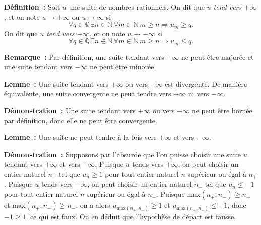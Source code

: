     \done

\medskip

\noindent\textbf{Définition :} Soit $u$ une suite de nombres rationnels. 
    On dit que \emph{$u$ tend vers $+\infty$}, et on note $u \rightarrow + \infty$ ou $u \rightarrow \infty$ si
    \begin{equation*}
        \forall q \in \mathbb{Q} \, 
        \exists n \in \mathbb{N} \, 
        \forall m \in \mathbb{N} \, 
        m \geq n \Rightarrow
            u_m \geq q.
    \end{equation*}
    On dit que \emph{$u$ tend vers $-\infty$}, et on note $u \rightarrow - \infty$ si
    \begin{equation*}
        \forall q \in \mathbb{Q} \, 
        \exists n \in \mathbb{N} \, 
        \forall m \in \mathbb{N} \, 
        m \geq n \Rightarrow
            u_m \leq q.
    \end{equation*}

\medskip

\noindent\textbf{Remarque :} Par définition, une suite tendant vers $+\infty$ ne peut être majorée et une suite tendant vers $-\infty$ ne peut être minorée.

\medskip

\noindent\textbf{Lemme :} Une suite tendant vers $+\infty$ ou vers $-\infty$ est divergente. 
    De manière équivalente, une suite convergente ne peut tendre vers $+\infty$ ni vers $-\infty$.

\medskip

\noindent\textbf{Démonstration :} Une suite tendant vers $+\infty$ ou vers $-\infty$ ne peut être bornée par définition, donc elle ne peut être convergente.

\done

\medskip

\noindent\textbf{Lemme :} Une suite ne peut tendre à la fois vers $+\infty$ et vers $-\infty$. 

\medskip

\noindent\textbf{Démonstration :} Supposons par l'absurde que l'on puisse choisir une suite $u$ tendant vers $+\infty$ et vers $-\infty$.
    Puisque $u$ tends vers $+\infty$, on peut choisir un entier naturel $n_+$ tel que $u_n \geq 1$ pour tout entier naturel $n$ supérieur ou égal à $n_+$.
    Puisque $u$ tends vers $-\infty$, on peut choisir un entier naturel $n_-$ tel que $u_n \leq -1$ pour tout entier naturel $n$ supérieur ou égal à $n_-$.
    Puisque $\mathrm{max}(n_+, n_-) \geq n_+$ et  $\mathrm{max}(n_+, n_-) \geq n_-$, on a alors $u_{ \mathrm{max}(n_+, n_-) } \geq 1$ et $u_{ \mathrm{max}(n_+, n_-) } \leq -1$, donc $-1 \geq 1$, ce qui est faux.
    On en déduit que l'hypothèse de départ est fausse.

